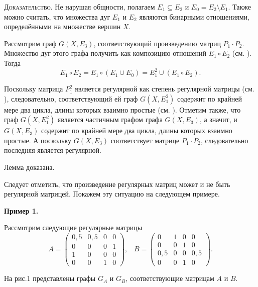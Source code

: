 \documentclass[a4paper,12pt]{article}
\begin{document}
\textsc{Доказательство. }
	Не нарушая общности, полагаем $E_1 \subseteq E_2$ и $E_0=E_2\setminus E_1$. Также можно считать, что множества дуг $E_1$ и $E_2$ являются бинарными отношениями, определёнными на множестве вершин $X$.

   Рассмотрим граф $G(X,E_3)$, соответствующий произведению матриц $P_1\cdot P_2$. Множество дуг этого графа  получить как композицию отношений $E_1\circ E_2$ (см. \cite{SvSkor:kompozOtn}). Тогда $$E_1\circ E_2=E_1\circ (E_1\cup E_0)=E_1^2\cup (E_1\circ E_2).$$  
   
   Поскольку матрица $P_1^2$ является регулярной как степень регулярной матрицы (см. \cite{SvSkor:Gant1}), следовательно, соответствующий ей граф $G(X,E_1^2)$ содержит по крайней мере два цикла, длины которых взаимно простые (см. \cite{SvSkor:Skor2}). Отметим также, что граф $G(X,E_1^2)$ является частичным графом графа $G(X,E_3)$, а значит, и $G(X,E_3)$ содержит по крайней мере два цикла, длины которых взаимно простые. А поскольку $G(X,E_3)$ соответствует матрице $P_1\cdot P_2$, следовательно последняя является регулярной.
   
   Лемма доказана.


Следует отметить, что произведение регулярных матриц может и не быть регулярной матрицей. Покажем эту ситуацию на следующем примере.

{\bf Пример 1.}

Рассмотрим следующие регулярные матрицы
$$ A = \left(\begin{array}{cccc}
		0{,}5 & 0{,}5 & 0 & 0 \\
		0 & 0 & 0 & 1 \\
		1 & 0 & 0 & 0 \\
		0 & 0 & 1 & 0
	\end{array}\right),\;\;\;    
	B = \left(\begin{array}{cccc}
	0 & 1 & 0 & 0 \\
	0 & 0 & 1 & 0 \\
	0{,}5 & 0 & 0 & 0{,}5 \\
	0 & 0 & 1 & 0
	\end{array}\right).
$$

На рис.1 представлены графы $G_A$ и $G_B$, соответствующие матрицам $A$ и $B$.
\end{document}

